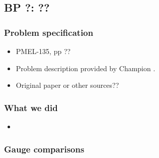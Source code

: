 
\newsection
\subsection{BP ?:    %
 ??}                 %

\subsubsection{Problem specification}

\begin{itemize}

\item PMEL-135, pp ??

\item Problem description provided by Champion 
      \cite{bp?description}.  %

\item Original paper or other sources??

\end{itemize} 


\subsubsection{What we did}


\begin{itemize}
\item  
\end{itemize} 



\subsubsection{Gauge comparisons}



